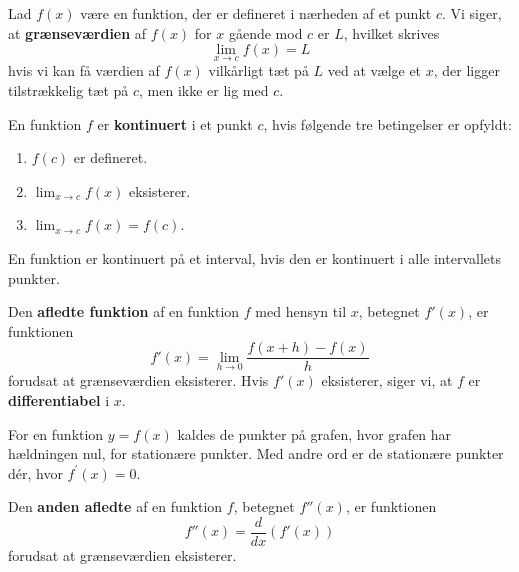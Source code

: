 

\begin{definition}[Grænseværdi]
Lad \( f(x) \) være en funktion, der er defineret i nærheden af et punkt \( c \). Vi siger, at \textbf{grænseværdien} af \( f(x) \) for \( x \) gående mod \( c \) er \( L \), hvilket skrives
\vspace{0.5em}
\[
\lim_{x \to c} f(x) = L
\]
\vspace{0.5em}
hvis vi kan få værdien af \( f(x) \) vilkårligt tæt på \( L \) ved at vælge et \( x \), der ligger tilstrækkelig tæt på \( c \), men ikke er lig med \( c \).
\end{definition}

\begin{definition}[Kontinuitet]
En funktion \( f \) er \textbf{kontinuert} i et punkt \( c \), hvis følgende tre betingelser er opfyldt:
\begin{enumerate}
    \item \( f(c) \) er defineret.
    \item \( \lim_{x \to c} f(x) \) eksisterer.
    \item \( \lim_{x \to c} f(x) = f(c) \).
\end{enumerate}
En funktion er kontinuert på et interval, hvis den er kontinuert i alle intervallets punkter.
\end{definition}

\begin{definition}
Den \textbf{afledte funktion} af en funktion \( f \) med hensyn til \( x \), betegnet \( f'(x) \), er funktionen
\[
f'(x) = \lim_{h \to 0} \frac{f(x+h) - f(x)}{h}
\]
forudsat at grænseværdien eksisterer. Hvis \( f'(x) \) eksisterer, siger vi, at \( f \) er \textbf{differentiabel} i \( x \).
\end{definition}

\begin{definition}
     For en funktion $y=f(x)$ kaldes de punkter på grafen, hvor grafen har hældningen nul, for stationære punkter. Med andre ord er de stationære punkter dér, hvor $f^{\prime}(x)=0$.
    \end{definition}

\begin{definition}
Den \textbf{anden afledte} af en funktion \( f \), betegnet \( f''(x) \), er funktionen
\[
f''(x) = \frac{d}{dx} \left( f'(x) \right)
\]
forudsat at grænseværdien eksisterer.
\end{definition}

